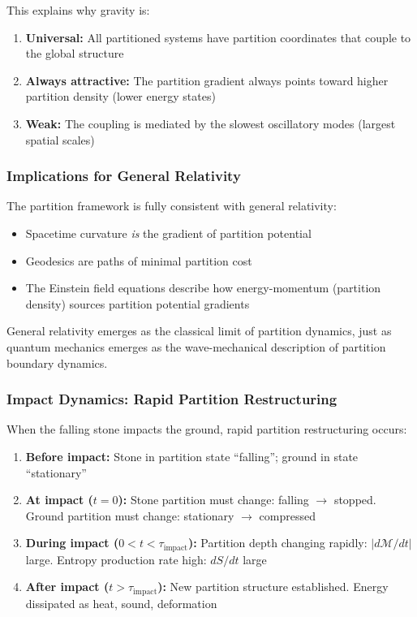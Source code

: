 \documentclass[twocolumn,10pt,a4paper]{article}
\theoremstyle{definition}
\theoremstyle{remark}
\newcommand{\Depth}{\mathcal{M}}
\begin{document}
This explains why gravity is:
\begin{enumerate}
    \item \textbf{Universal:} All partitioned systems have partition coordinates that couple to the global structure
    \item \textbf{Always attractive:} The partition gradient always points toward higher partition density (lower energy states)
    \item \textbf{Weak:} The coupling is mediated by the slowest oscillatory modes (largest spatial scales)
\end{enumerate}

\subsubsection{Implications for General Relativity}

The partition framework is fully consistent with general relativity:
\begin{itemize}
    \item Spacetime curvature \emph{is} the gradient of partition potential
    \item Geodesics are paths of minimal partition cost
    \item The Einstein field equations describe how energy-momentum (partition density) sources partition potential gradients
\end{itemize}

General relativity emerges as the classical limit of partition dynamics, just as quantum mechanics emerges as the wave-mechanical description of partition boundary dynamics.

\subsubsection{Impact Dynamics: Rapid Partition Restructuring}

When the falling stone impacts the ground, rapid partition restructuring occurs:

\begin{enumerate}
    \item \textbf{Before impact:} Stone in partition state ``falling''; ground in state ``stationary''
    \item \textbf{At impact ($t = 0$):} Stone partition must change: falling $\to$ stopped. Ground partition must change: stationary $\to$ compressed
    \item \textbf{During impact ($0 < t < \tau_{\text{impact}}$):} Partition depth changing rapidly: $|d\Depth/dt|$ large. Entropy production rate high: $dS/dt$ large
    \item \textbf{After impact ($t > \tau_{\text{impact}}$):} New partition structure established. Energy dissipated as heat, sound, deformation
\end{enumerate}
\end{document}
